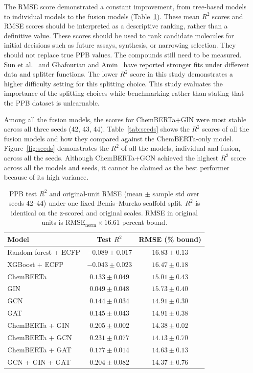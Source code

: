 \documentclass[11pt,a4paper]{article}
\begin{document}
The RMSE score demonstrated a constant improvement, from tree-based models to individual models to the fusion models (Table~\ref{tab:main}).
These mean $R^{2}$ scores and RMSE scores should be interpreted as a descriptive ranking, rather than a definitive value.
These scores should be used to rank candidate molecules for initial decisions such as future assays, synthesis, or narrowing selection.
They should not replace true PPB values.
The compounds still need to be measured.
Sun et al.~\cite{sun2018ppb} and Ghafourian and Amin~\cite{ghafourian2013ppb} have reported stronger fits under different data and splitter functions.
The lower $R^{2}$ score in this study demonstrates a higher difficulty setting for this splitting choice.
This study evaluates the importance of the splitting choices while benchmarking rather than stating that the PPB dataset is unlearnable.

Among all the fusion models, the scores for ChemBERTa+GIN were most stable across all three seeds (42, 43, 44).
Table~\ref{tab:seeds} shows the $R^{2}$ scores of all the fusion models and how they compared against the ChemBERTa-only model.
Figure~\ref{fig:seeds} demonstrates the $R^{2}$ of all the models, individual and fusion, across all the seeds.
Although ChemBERTa+GCN achieved the highest $R^{2}$ score across all the models and seeds, it cannot be claimed as the best performer because of its high variance.

\begin{table}[H]
\centering
\caption{PPB test $R^{2}$ and original-unit RMSE (mean $\pm$ sample std over seeds 42--44) under one fixed Bemis--Murcko scaffold split. $R^{2}$ is identical on the z-scored and original scales. RMSE in original units is $\mathrm{RMSE}_{\mathrm{norm}}\times 16.61$ percent bound.}
\label{tab:main}
\begin{tabular}{lcc}
\toprule
\textbf{Model} & \textbf{Test $R^{2}$} & \textbf{RMSE (\% bound)} \\
\midrule
Random forest + ECFP & $-0.089 \pm 0.017$ & $16.83 \pm 0.13$ \\
XGBoost + ECFP & $-0.043 \pm 0.023$ & $16.47 \pm 0.18$ \\
ChemBERTa & $0.133 \pm 0.049$ & $15.01 \pm 0.43$ \\
GIN & $0.049 \pm 0.048$ & $15.73 \pm 0.40$ \\
GCN & $0.144 \pm 0.034$ & $14.91 \pm 0.30$ \\
GAT & $0.145 \pm 0.043$ & $14.91 \pm 0.38$ \\
ChemBERTa + GIN & $0.205 \pm 0.002$ & $14.38 \pm 0.02$ \\
ChemBERTa + GCN & $0.231 \pm 0.077$ & $14.13 \pm 0.70$ \\
ChemBERTa + GAT & $0.177 \pm 0.014$ & $14.63 \pm 0.13$ \\
GCN + GIN + GAT & $0.204 \pm 0.082$ & $14.37 \pm 0.76$ \\
\bottomrule
\end{tabular}
\end{table}
\end{document}
